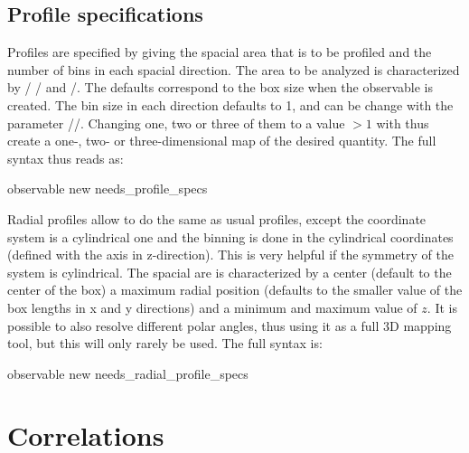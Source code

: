 \subsection{Profile specifications}
\label{sec:DensProfSpec}
Profiles are specified by giving the spacial area that is to be profiled and
the number of bins in each spacial direction. The area to be analyzed is characterized
by / / and /. The defaults
correspond to the box size when the observable is created.
The bin size in each direction defaults to 1, and can be change with the parameter 
//. Changing one, two or three of them to 
a value $>1$ with thus create a one-, two- or three-dimensional map of the desired quantity.
The full syntax thus reads as:
\begin{essyntax}
    observable new needs\_profile\_specs  
\end{essyntax}

Radial profiles allow to do the same as usual profiles, except the coordinate system is a cylindrical
one and the binning is done in the cylindrical coordinates (defined with the axis in z-direction). 
This is very helpful if the symmetry of the
system is cylindrical. The spacial are is characterized by a center (default to the center of the box)
a maximum radial position  (defaults to the smaller value of the box lengths in x and y directions)
and a minimum and maximum value of $z$. It is possible to also resolve different polar angles, thus using it
as a full 3D mapping tool, but this will only rarely be used. The full syntax is:
\begin{essyntax}
    observable new needs\_radial\_profile\_specs  
\end{essyntax}


\section{Correlations}
\label{sec:Correlations}

